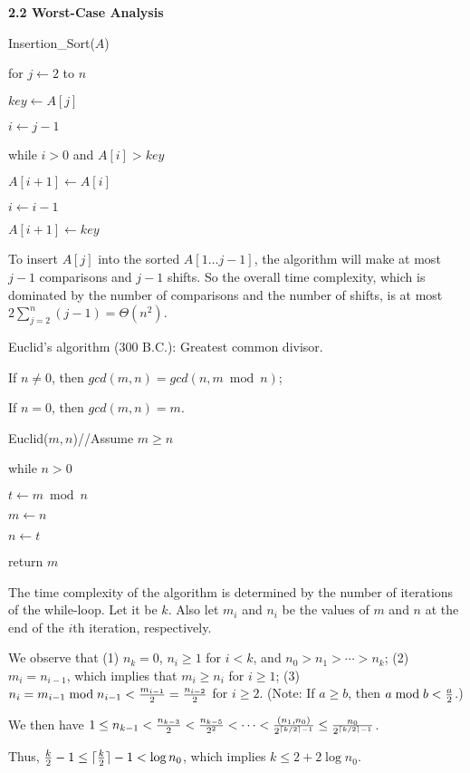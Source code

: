 

    \textbf{2.2 Worst-Case Analysis}
    
Insertion\_Sort($A$)
\par\quad for $j\leftarrow 2$ to $n$
\par\quad\quad $key\leftarrow A[j]$
\par\quad\quad $i\leftarrow j-1$
\par\quad\quad while $i>0$ and $A[i]>key$
\par\quad\quad\quad $A[i+1]\leftarrow A[i]$
\par\quad\quad\quad $i\leftarrow i-1$
\par\quad\quad $A[i+1]\leftarrow key$

To insert $A[j]$ into the sorted $A[1\ldots j-1]$, the algorithm
will make at most $j-1$ comparisons and $j-1$ shifts. So the overall 
time complexity,
which is dominated by the number of comparisons and the number of
shifts, is at most $2\sum_{j=2}^n(j-1)
=\Theta(n^2)$.



Euclid's algorithm (300 B.C.): Greatest common divisor.

If $n\not=0$, then $gcd(m,n)=gcd(n, m \bmod n)$;

If $n=0$, then $gcd(m,n)=m$.

Euclid($m,n$)\qquad //Assume $m\ge n$
\par\quad while $n>0$
\par\quad\quad $t\leftarrow m\bmod n$
\par\quad\quad $m\leftarrow n$
\par\quad\quad $n\leftarrow t$
\par\quad return $m$

The time complexity of the algorithm is determined by the number of iterations
of the while-loop. Let it be $k$. Also let $m_i$ and $n_i$ be the values of
$m$ and $n$ at the end of the $i$th iteration, respectively.

We observe that (1) $n_k=0$, $n_i\ge 1$ for $i<k$, and 
$n_0>n_1>\cdots>n_k$; (2) $m_i=n_{i-1}$, which implies that $m_i\ge n_i$ 
for $i\ge1$; (3) $n_i=m_{i-1} \bmod n_{i-1}<{m_{i-1}\over2}={n_{i-2}\over2}$
for $i\ge2$. (Note: If $a\ge b$, then $a\bmod b<{a\over2}$.)

We then have $1\le n_{k-1}<{n_{k-3}\over2}<{n_{k-5}\over2^2}<\cdots<
{(n_1,n_0)\over2^{\lceil k/2\rceil-1}}\le {n_0\over2^{\lceil k/2\rceil-1}}$.

Thus, ${k\over2}-1\le\lceil{k\over2}\rceil-1<\log n_0$,
which implies $k\le 2+2\log n_0$.

